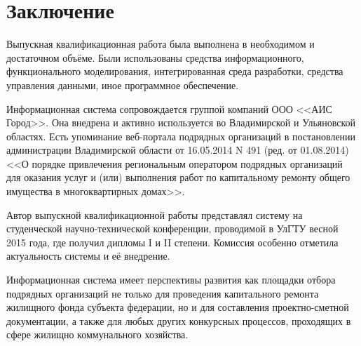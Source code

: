 \section*{Заключение}

Выпускная квалификационная работа была выполнена в необходимом и достаточном объёме.
Были использованы средства информационного, функционального моделирования, интегрированная среда разработки, средства управления данными, иное программное обеспечение.

Информационная система сопровождается группой компаний ООО <<АИС Город>>.
Она внедрена и активно используется во Владимирской и Ульяновской областях.
Есть упоминание веб-портала подрядных организаций в постановлении администрации Владимирской области от 16.05.2014 N 491 (ред. от 01.08.2014) <<О порядке привлечения региональным оператором подрядных организаций для оказания услуг и (или) выполнения работ по капитальному ремонту общего имущества в многоквартирных домах>>.

Автор выпускной квалификационной работы представлял систему на студенческой научно-технической конференции, проводимой в УлГТУ весной 2015 года, где получил дипломы I и II степени.
Комиссия особенно отметила актуальность системы и её внедрение.

Информационная система имеет перспективы развития как площадки отбора подрядных организаций не только для проведения капитального ремонта жилищного фонда субъекта федерации, но и для составления проектно-сметной документации, а также для любых других конкурсных процессов, проходящих в сфере жилищно коммунального хозяйства.

\clearpage
\newpage
